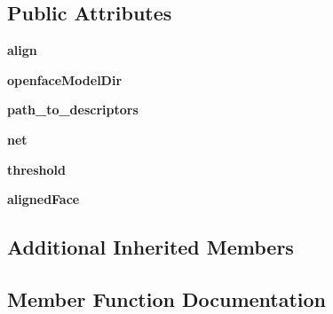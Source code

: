 \subsection*{Public Attributes}
\begin{DoxyCompactItemize}
\item 
{\bfseries align}\hypertarget{classRecognitionFactory_1_1OpenFace_a1c901bdf709de3d7e1b40093af926974}{}\label{classRecognitionFactory_1_1OpenFace_a1c901bdf709de3d7e1b40093af926974}

\item 
{\bfseries openface\+Model\+Dir}\hypertarget{classRecognitionFactory_1_1OpenFace_a1ee73330a23fce8a6ca41231d778ec91}{}\label{classRecognitionFactory_1_1OpenFace_a1ee73330a23fce8a6ca41231d778ec91}

\item 
{\bfseries path\+\_\+to\+\_\+descriptors}\hypertarget{classRecognitionFactory_1_1OpenFace_acaa350f52e5e1a71b2d6643403ec1af1}{}\label{classRecognitionFactory_1_1OpenFace_acaa350f52e5e1a71b2d6643403ec1af1}

\item 
{\bfseries net}\hypertarget{classRecognitionFactory_1_1OpenFace_a4cd893ba8a2c3882481901c1093c3ae3}{}\label{classRecognitionFactory_1_1OpenFace_a4cd893ba8a2c3882481901c1093c3ae3}

\item 
{\bfseries threshold}\hypertarget{classRecognitionFactory_1_1OpenFace_a334cc50444b6906a8c08ec658c8f5438}{}\label{classRecognitionFactory_1_1OpenFace_a334cc50444b6906a8c08ec658c8f5438}

\item 
{\bfseries aligned\+Face}\hypertarget{classRecognitionFactory_1_1OpenFace_a1acaa386b19695644e18eab416f390ee}{}\label{classRecognitionFactory_1_1OpenFace_a1acaa386b19695644e18eab416f390ee}

\end{DoxyCompactItemize}
\subsection*{Additional Inherited Members}


\subsection{Member Function Documentation}
